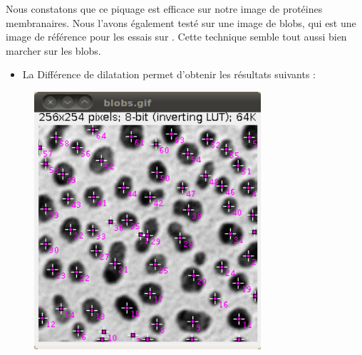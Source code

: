 Nous constatons que ce piquage est efficace sur notre image de protéines membranaires. Nous l'avons également testé sur une image de blobs, qui est une image de référence pour les essais sur \imj. Cette technique semble tout aussi bien marcher sur les blobs. \\

\begin{itemize}
\item La Différence de dilatation permet d'obtenir les résultats suivants :
\end{itemize}

\begin{figure}[!ht]
\begin{center}
 \begin{minipage}{.450\linewidth}
  \includegraphics[width=0.75\textwidth]{blobDilate.png}  
 \end{minipage} \hfill
\begin{minipage}{.450\linewidth}

\end{minipage}
\end{center}
\end{figure}
